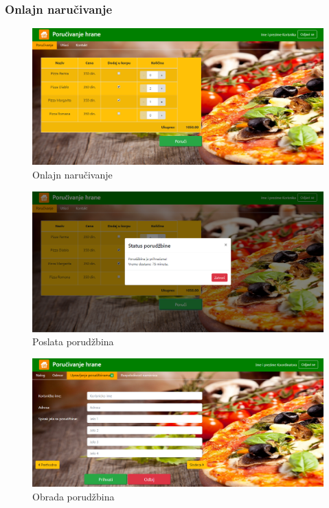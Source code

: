 \subsubsection{Onlajn naručivanje}
 \begin{figure}[!h]
    \includegraphics[width=1\textwidth]{slike/narucivanje.png}
    \caption{Onlajn naručivanje} %
    \label{fig:slika_narucivanje}
\end{figure}
\begin{figure}[!h]
    \includegraphics[width=1\textwidth]{slike/narucivanje1.png}
    \caption{Poslata porudžbina} %
    \label{fig:slika_narucivanje1}
\end{figure}
\begin{figure}[!h]
    \includegraphics[width=1\textwidth]{slike/upravljanje_porudzbinama.png}
    \caption{Obrada porudžbina} %
    \label{fig:slika_obrada_porudzbina}
\end{figure}
